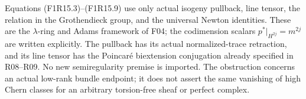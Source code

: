 Equations (F1R15.3)--(F1R15.9) use only actual isogeny
pullback, line tensor, the relation in the Grothendieck group,
and the universal Newton identities. These are the
$\lambda$-ring and Adams framework of F04; the codimension
scalars $p^*|_{H^{2j}}=m^{2j}$ are written explicitly.
The pullback has its actual normalized-trace retraction,
and its line tensor has the Poincar\'e biextension
conjugation already specified in R08--R09. No new
semiregularity premise is imported. The obstruction
concerns an actual low-rank bundle endpoint; it does not
assert the same vanishing of high Chern classes for an
arbitrary torsion-free sheaf or perfect complex.
